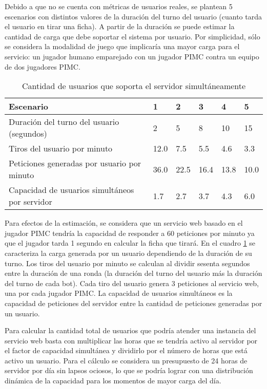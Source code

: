 Debido a que no se cuenta con métricas de usuarios reales, se plantean 5
escenarios con distintos valores de la duración del turno del usuario (cuanto
tarda el usuario en tirar una ficha). A partir de la duración se puede estimar
la cantidad de carga que debe soportar el sistema por usuario. Por simplicidad,
sólo se considera la modalidad de juego que implicaría una mayor carga para el
servicio: un jugador humano emparejado con un jugador PIMC contra un equipo de
dos jugadores PIMC.

\begin{table}[!ht]
    \centering
    \caption{
        Cantidad de usuarios que soporta el servidor simultáneamente
        }
    \small
    \begin{tabular}{|l|l|l|l|l|l|}
    \hline
        Escenario & 1 & 2 & 3 & 4 & 5 \\ \hline
        Duración del turno del usuario (segundos) & 2 & 5 & 8 & 10 & 15 \\ \hline
        Tiros del usuario por minuto & 12.0 & 7.5 & 5.5 & 4.6 & 3.3 \\ \hline
        Peticiones generadas por usuario por minuto & 36.0 & 22.5 & 16.4 & 13.8 & 10.0 \\ \hline
        Capacidad de usuarios simultáneos por servidor & 1.7 & 2.7 & 3.7 & 4.3 & 6.0 \\ \hline
    \end{tabular}
    \label{CPC}
\end{table}

Para efectos de la estimación, se considera que un servicio web basado en el
jugador PIMC tendría la capacidad de responder a 60 peticiones por minuto ya que
el jugador tarda 1 segundo en calcular la ficha que tirará. En el cuadro
\ref{CPC} se caracteriza la carga generada por un usuario dependiendo de la
duración de su turno. Los tiros del usuario por minuto se calculan al dividir
sesenta segundos entre la duración de una ronda (la duración del turno del
usuario más la duración del turno de cada bot). Cada tiro del usuario genera 3
peticiones al servicio web, una por cada jugador PIMC. La capacidad de usuarios
simultáneos es la capacidad de peticiones del servidor entre la cantidad de
peticiones generadas por un usuario.

Para calcular la cantidad total de usuarios que podría atender una instancia del
servicio web basta con multiplicar las horas que se tendría activo al servidor
por el factor de capacidad simultánea y dividirlo por el número de horas que
está activo un usuario. Para el cálculo se considera un presupuesto de 24 horas
de servidor por día sin lapsos ociosos, lo que se podría lograr con una
distribución dinámica de la capacidad para los momentos de mayor carga del día.

